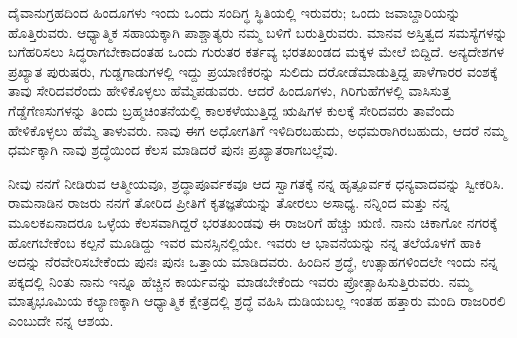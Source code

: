 ದೈವಾನುಗ್ರಹದಿಂದ ಹಿಂದೂಗಳು ಇಂದು ಒಂದು ಸಂದಿಗ್ಧ ಸ್ಥಿತಿಯಲ್ಲಿ ಇರುವರು; ಒಂದು ಜವಾಬ್ದಾರಿಯನ್ನು ಹೊತ್ತಿರುವರು. ಆಧ್ಯಾತ್ಮಿಕ ಸಹಾಯಕ್ಕಾಗಿ ಪಾಶ್ಚಾತ್ಯರು ನಮ್ಮ ಬಳಿಗೆ ಬರುತ್ತಿರುವರು. ಮಾನವ ಅಸ್ತಿತ್ವದ ಸಮಸ್ಯೆಗಳನ್ನು ಬಗೆಹರಿಸಲು ಸಿದ್ಧರಾಗಬೇಕಾದಂತಹ ಒಂದು ಗುರುತರ ಕರ್ತವ್ಯ ಭರತಖಂಡದ ಮಕ್ಕಳ ಮೇಲೆ ಬಿದ್ದಿದೆ. ಅನ್ಯದೇಶಗಳ ಪ್ರಖ್ಯಾತ ಪುರುಷರು, ಗುಡ್ಡಗಾಡುಗಳಲ್ಲಿ ಇದ್ದು ಪ್ರಯಾಣಿಕರನ್ನು ಸುಲಿದು ದರೋಡೆಮಾಡುತ್ತಿದ್ದ ಪಾಳೆಗಾರರ ವಂಶಕ್ಕೆ ತಾವು ಸೇರಿದವರೆಂದು ಹೇಳಿಕೊಳ್ಳಲು ಹೆಮ್ಮೆಪಡುವರು. ಆದರೆ ಹಿಂದೂಗಳು, ಗಿರಿಗುಹೆಗಳಲ್ಲಿ ವಾಸಿಸುತ್ತ ಗೆಡ್ಡೆಗೆಣಸುಗಳನ್ನು ತಿಂದು ಬ್ರಹ್ಮಚಿಂತನೆಯಲ್ಲಿ ಕಾಲಕಳೆಯುತ್ತಿದ್ದ ಋಷಿಗಳ ಕುಲಕ್ಕೆ ಸೇರಿದವರು ತಾವೆಂದು ಹೇಳಿಕೊಳ್ಳಲು ಹೆಮ್ಮೆ ತಾಳುವರು. ನಾವು ಈಗ ಅಧೋಗತಿಗೆ ಇಳಿದಿರಬಹುದು, ಅಧಮರಾಗಿರಬಹುದು, ಆದರೆ ನಮ್ಮ ಧರ್ಮಕ್ಕಾಗಿ ನಾವು ಶ್ರದ್ಧೆಯಿಂದ ಕೆಲಸ ಮಾಡಿದರೆ ಪುನಃ ಪ್ರಖ್ಯಾತರಾಗಬಲ್ಲೆವು. 

ನೀವು ನನಗೆ ನೀಡಿರುವ ಆತ್ಮೀಯವೂ, ಶ್ರದ್ಧಾಪೂರ್ವಕವೂ ಆದ ಸ್ವಾಗತಕ್ಕೆ ನನ್ನ ಹೃತ್ಪೂರ್ವಕ ಧನ್ಯವಾದವನ್ನು ಸ್ವೀಕರಿಸಿ. ರಾಮನಾಡಿನ ರಾಜರು ನನಗೆ ತೋರಿದ ಪ್ರೀತಿಗೆ ಕೃತಜ್ಞತೆಯನ್ನು ತೋರಲು ಅಸಾಧ್ಯ. ನನ್ನಿಂದ ಮತ್ತು ನನ್ನ ಮೂಲಕ\break ಏನಾದರೂ ಒಳ್ಳೆಯ ಕೆಲಸವಾಗಿದ್ದರೆ ಭರತಖಂಡವು ಈ ರಾಜರಿಗೆ ಹೆಚ್ಚು ಋಣಿ. ನಾನು ಚಿಕಾಗೋ ನಗರಕ್ಕೆ ಹೋಗಬೇಕೆಂಬ ಕಲ್ಪನೆ ಮೂಡಿದ್ದು ಇವರ ಮನಸ್ಸಿನಲ್ಲಿಯೇ. ಇವರು ಆ ಭಾವನೆಯನ್ನು ನನ್ನ ತಲೆಯೊಳಗೆ ಹಾಕಿ ಅದನ್ನು ನೆರ\-ವೇರಿಸ\-ಬೇಕೆಂದು ಪುನಃ ಪುನಃ ಒತ್ತಾಯ ಮಾಡಿದವರು. ಹಿಂದಿನ ಶ್ರದ್ಧೆ, ಉತ್ಸಾಹಗಳಿಂದಲೇ ಇಂದು ನನ್ನ ಪಕ್ಕದಲ್ಲಿ ನಿಂತು ನಾನು ಇನ್ನೂ ಹೆಚ್ಚಿನ ಕಾರ್ಯವನ್ನು ಮಾಡಬೇಕೆಂದು ಇವರು ಪ್ರೋತ್ಸಾಹಿಸುತ್ತಿರುವರು. ನಮ್ಮ ಮಾತೃಭೂಮಿಯ ಕಲ್ಯಾಣಕ್ಕಾಗಿ ಆಧ್ಯಾತ್ಮಿಕ ಕ್ಷೇತ್ರದಲ್ಲಿ ಶ್ರದ್ಧೆ ವಹಿಸಿ ದುಡಿಯಬಲ್ಲ ಇಂತಹ ಹತ್ತಾರು ಮಂದಿ ರಾಜರಿರಲಿ ಎಂಬುದೇ ನನ್ನ ಆಶಯ. 

